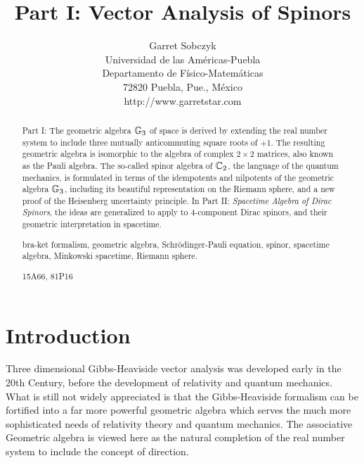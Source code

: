 \documentclass[]{article}
\begin{document}
\title{Part I: Vector Analysis of Spinors}
\author{Garret Sobczyk
\\ Universidad de las Am\'ericas-Puebla
 \\ Departamento de F\'isico-Matem\'aticas
\\72820 Puebla, Pue., M\'exico
\\ http://www.garretstar.com}
\maketitle
\begin{abstract}Part I:  The geometric algebra $\mathbb{G}_3$ of space is derived by extending the real number system 
to include three mutually anticommuting square roots of $+ 1$. The resulting geometric
algebra is isomorphic to the algebra of complex $2\times 2$ matrices, also known as the Pauli algebra.
The so-called spinor algebra of $\mathbb{C}_2$, the language of the quantum mechanics, is formulated in terms of the
idempotents and nilpotents of the geometric algebra $\mathbb{G}_3$, including its beautiful representation on the Riemann sphere,
and a new proof of the Heisenberg uncertainty principle. In Part II: {\it Spacetime Algebra of Dirac Spinors}, the ideas are
generalized to apply to $4$-component Dirac spinors, and their geometric interpretation in spacetime.

\smallskip

\smallskip

 bra-ket formalism, geometric algebra, Schr\"odinger-Pauli equation, spinor, 
spacetime algebra, Minkowski spacetime, Riemann sphere.

\smallskip

 15A66, 81P16 

\end{abstract}

\section{Introduction}
Three dimensional Gibbs-Heaviside vector analysis was developed early in the 20th Century, before
the development of relativity and quantum mechanics. What is still not widely appreciated is that
the Gibbs-Heaviside formalism can be fortified into a far more powerful geometric algebra which
serves the much more sophisticated needs of relativity theory and quantum mechanics. The associative
Geometric algebra is viewed here as the natural completion of the real number system to include the concept
of direction. 
\end{document}
